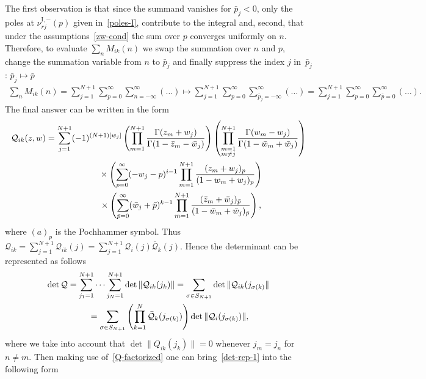 \documentclass[11pt]{article}
\numberwithin{equation}{section}
\numberwithin{equation}{section}
\begin{document}
The first observation is that since the summand vanishes for $\bar p_j < 0$, only the poles at
$\nu^{\mathrm{I},-}_{rj}(p)$ given in~\eqref{poles-I}, contribute to the integral and, second, that under the
assumptions~\eqref{zw-cond} the sum over $p$ converges uniformly on $n$. Therefore, to evaluate $\sum_n M_{ik}(n)$ we
swap the summation over $n$ and $p$, change the summation variable from $n$ to $\bar p_j$ and finally suppress the
index $j$ in~$\bar p_j$: $\bar p_j\mapsto \bar p$
\begin{gather*}
\sum_n M_{ik}(n)=\sum_{j=1}^{N+1}\sum_{p= 0}^{\infty} \sum_{n=-\infty}^{\infty}( \ldots )
\mapsto \sum_{j=1}^{N+1}\sum_{p= 0}^{\infty}
\sum_{\bar p_j=-\infty}^{\infty}( \ldots ) =\sum_{j=1}^{N+1}\sum_{p= 0}^{\infty}
\sum_{\bar p =0}^{\infty}( \ldots ).
\end{gather*}
The final answer can be written in the form
\begin{gather}
\mathcal Q_{ik}(z,w) =\sum_{j=1}^{N+1} (-1)^{(N+1)[w_j]}
\left(\prod_{m=1}^{N+1}\frac{\Gamma(z_m+w_{j})}{\Gamma(1-\bar z_m-\bar w_{j})}\right)\left(
\prod_{\substack{m=1\\ m\neq j}}^{ N+1}\frac{ \Gamma(w_m-w_{j})}{\Gamma(1-\bar w_m+\bar w_{j})}\right)\notag\\
\hphantom{\mathcal Q_{ik}(z,w)=}{} \times
\left(\sum_{p=0}^{\infty} (-w_{j}-p)^{i-1}\prod_{m=1}^{N+1}
\frac{(z_m+w_{j})_{p}}{(1-w_m+w_{j})_{p}}\right)\nonumber\\
\hphantom{\mathcal Q_{ik}(z,w)=}{} \times
\left(\sum_{\bar p=0}^{\infty}(\bar w_{j} + \bar p)^{k-1}\prod_{m=1}^{N+1}
\frac{(\bar z_m+\bar w_{j})_{\bar p}}{(1-\bar w_m+\bar w_{j})_{\bar p}}\right) , \label{Q-factorized}
\end{gather}
where $(a)_p$ is the Pochhammer symbol. Thus $\mathcal Q_{ik}=\sum\limits_{j=1}^{N+1} \mathcal Q_{ik}(j)= \sum\limits_{j=1}^{N+1} \mathcal Q_{i}(j)\bar{\mathcal Q}_k(j)$. Hence the determinant can be represented as follows
\begin{gather*}
\det\mathcal Q =\sum_{j_1=1}^{N+1}\cdots \sum_{j_N=1}^{N+1}
\det\|\mathcal Q_{ik}(j_k)\| =\sum_{\sigma\in S_{N+1}}
\det \| \mathcal Q_{ik}(j_{\sigma(k)}\|
\notag\\
\hphantom{\det\mathcal Q}{} =\sum_{\sigma\in S_{N+1}} \left(\prod_{k=1}^N\bar{\mathcal Q}_k(j_{\sigma(k)})\right)
\det\| \mathcal Q_{i}(j_{\sigma(k)})\|,
\end{gather*}
where we take into account that $\det\|Q_{ik}(j_k)\|=0$ whenever $j_{m}=j_n$ for $n\neq m$. Then making use of~\eqref{Q-factorized} one can bring~\eqref{det-rep-1} into the following form
\end{document}
